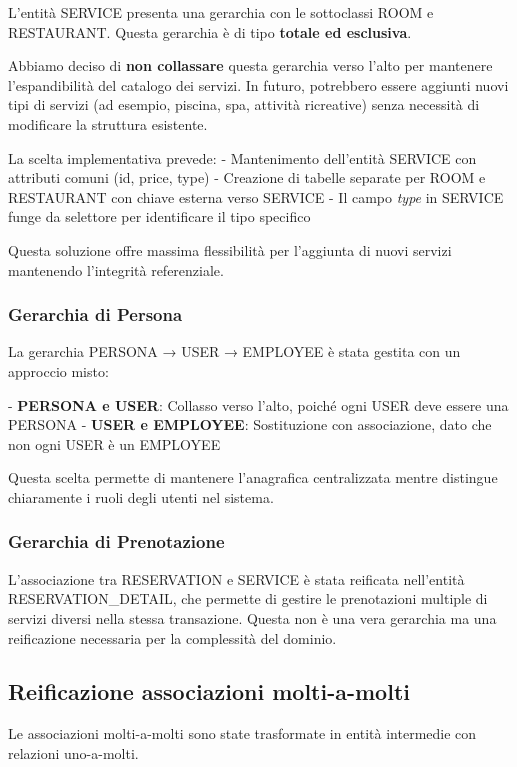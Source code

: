 \documentclass[a4paper,12pt]{report}
\begin{document}
L'entità SERVICE presenta una gerarchia con le sottoclassi ROOM e RESTAURANT. Questa gerarchia è di tipo \textbf{totale ed esclusiva}. 

Abbiamo deciso di \textbf{non collassare} questa gerarchia verso l'alto per mantenere l'espandibilità del catalogo dei servizi. In futuro, potrebbero essere aggiunti nuovi tipi di servizi (ad esempio, piscina, spa, attività ricreative) senza necessità di modificare la struttura esistente. 

La scelta implementativa prevede:
- Mantenimento dell'entità SERVICE con attributi comuni (id, price, type)
- Creazione di tabelle separate per ROOM e RESTAURANT con chiave esterna verso SERVICE
- Il campo \textit{type} in SERVICE funge da selettore per identificare il tipo specifico

Questa soluzione offre massima flessibilità per l'aggiunta di nuovi servizi mantenendo l'integrità referenziale.

\subsubsection{Gerarchia di Persona}

La gerarchia PERSONA → USER → EMPLOYEE è stata gestita con un approccio misto:

- \textbf{PERSONA e USER}: Collasso verso l'alto, poiché ogni USER deve essere una PERSONA
- \textbf{USER e EMPLOYEE}: Sostituzione con associazione, dato che non ogni USER è un EMPLOYEE

Questa scelta permette di mantenere l'anagrafica centralizzata mentre distingue chiaramente i ruoli degli utenti nel sistema.

\subsubsection{Gerarchia di Prenotazione}

L'associazione tra RESERVATION e SERVICE è stata reificata nell'entità RESERVATION\_DETAIL, che permette di gestire le prenotazioni multiple di servizi diversi nella stessa transazione. Questa non è una vera gerarchia ma una reificazione necessaria per la complessità del dominio.

\subsection{Reificazione associazioni molti-a-molti}

Le associazioni molti-a-molti sono state trasformate in entità intermedie con relazioni uno-a-molti.
\end{document}
